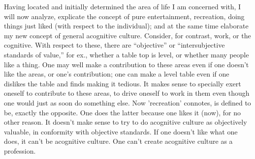 Having located and initially determined the area of life I am concerned with, I will now analyze, explicate the concept of pure entertainment, recreation, doing things just liked (with respect to the individual); and at the same time elaborate my new concept of general acognitive culture. Consider, for contrast, work, or the cognitive. With respect to these, there are \enquote{objective} or \enquote{intersubjective standards of value,} for ex., whether a table top is level, or whether many people like a thing. One may well make a contribution to these areas even if one doesn't like the areas, or one's contribution; one can make a level table even if one dislikes the table and finds making it tedious. It makes sense to specially exert oneself to contribute to these areas, to drive oneself to work in them even though one would just as soon do something else. Now 'recreation' connotes,  is defined to be, exactly the opposite. One does the latter because one likes it (now), for no other reason. It doesn't make sense to try to do acognitive culture as objectively valuable, in conformity with objective standards. If one doesn't like what one does, it can't be acognitive culture. One can't create acognitive culture as a profession.

